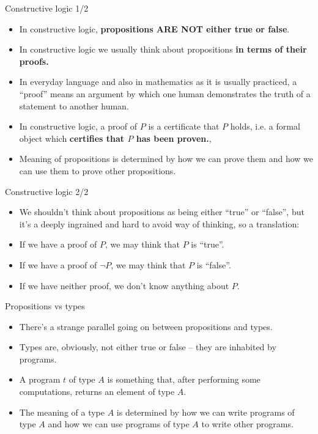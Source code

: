 \documentclass{beamer}
\begin{document}
\begin{frame}{Constructive logic 1/2}
\begin{itemize}
	\item In constructive logic, \textbf{propositions ARE NOT either true or false}.
	\item In constructive logic we usually think about propositions \textbf{in terms of their proofs.}
	\item In everyday language and also in mathematics as it is usually practiced, a ``proof'' means an argument by which one human demonstrates the truth of a statement to another human.
	\item In constructive logic, a proof of $P$ is a certificate that $P$ holds, i.e. a formal object which \textbf{certifies that $P$ has been proven.},
	\item Meaning of propositions is determined by how we can prove them and how we can use them to prove other propositions.
\end{itemize}
\end{frame}

\begin{frame}{Constructive logic 2/2}
\begin{itemize}
	\item We shouldn't think about propositions as being either ``true'' or ``false'', but it's a deeply ingrained and hard to avoid way of thinking, so a translation:
	\item If we have a proof of $P$, we may think that $P$ is ``true''.
	\item If we have a proof of $\neg P$, we may think that $P$ is ``false''.
	\item If we have neither proof, we don't know anything about $P$.
\end{itemize}
\end{frame}

\begin{frame}{Propositions vs types}
\begin{itemize}
	\item There's a strange parallel going on between propositions and types.
	\item Types are, obviously, not either true or false -- they are inhabited by programs.
	\item A program $t$ of type $A$ is something that, after performing some computations, returns an element of type $A$.
	\item The meaning of a type $A$ is determined by how we can write programs of type $A$ and how we can use programs of type $A$ to write other programs.
\end{itemize}
\end{frame}
\end{document}
